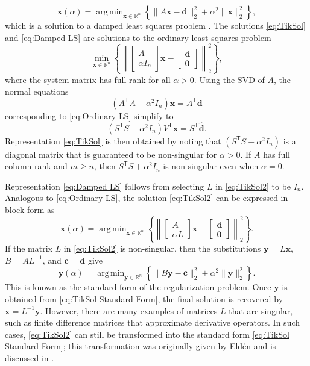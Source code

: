 \documentclass[12pt]{article}
\newcommand{\mA}{m}	%
\newcommand{\cVec}{\mathbf{c}}	%
\newcommand{\dVec}{\mathbf{d}}	%
\newcommand{\xVec}{\mathbf{x}}	%
\newcommand{\trans}[1]{{#1}^\mathsf{T}}	%
\newcommand{\regparam}{\alpha}  %
\DeclareMathOperator*{\argmin}{arg\,min}
\newcommand{\zeroVec}{\bm{0}}	%
\newcommand{\svd}[1]{\widehat{#1}}	%
\begin{document}
\begin{equation}
\label{eq:Damped LS}
\xVec(\regparam) = \argmin_{\xVec \in \mathbb{R}^n} \left\{\|A\xVec - \dVec\|_2^2 + \regparam^2\|\xVec\|_2^2\right\},
\end{equation}
which is a solution to a damped least squares problem \cite{ABT}. The solutions \eqref{eq:TikSol} and \eqref{eq:Damped LS} are solutions to the ordinary least squares problem
\begin{equation}
\label{eq:Ordinary LS}
\min_{\xVec \in \mathbb{R}^n} \left\{\left\|
\begin{bmatrix}
A \\
\regparam I_n
\end{bmatrix}\xVec - 
\begin{bmatrix}
\dVec \\
\zeroVec
\end{bmatrix}
\right\|_2^2\right\},
\end{equation}
where the system matrix has full rank for all $\regparam > 0$. Using the SVD of $A$, the normal equations 
\[(\trans{A}A + \regparam^2 I_n)\xVec = \trans{A}\dVec\]
corresponding to \eqref{eq:Ordinary LS} simplify to
\[(\trans{S}S + \regparam^2 I_n)\trans{V}\xVec = \trans{S}\svd{\dVec}.\]
Representation \eqref{eq:TikSol} is then obtained by noting that $(\trans{S}S + \regparam^2 I_n)$ is a diagonal matrix that is guaranteed to be non-singular for $\regparam > 0$. If $A$ has full column rank and $\mA \geq n$, then $\trans{S}S + \regparam^2 I_n$ is non-singular even when $\regparam = 0$. \par
Representation \eqref{eq:Damped LS} follows from selecting $L$ in \eqref{eq:TikSol2} to be $I_n$. Analogous to \eqref{eq:Ordinary LS}, the solution \eqref{eq:TikSol2} can be expressed in block form as
\begin{equation}
\xVec(\regparam) = \argmin_{\xVec \in \mathbb{R}^n} \left\{\left\| \begin{bmatrix}
A \\
\regparam L
\end{bmatrix}\xVec - \begin{bmatrix}
\dVec \\
\bm{0}
\end{bmatrix} \right\|_2^2\right\}.
\label{eq:TikSol3}
\end{equation}
If the matrix $L$ in \eqref{eq:TikSol2} is non-singular, then the substitutions $\mathbf{y} = L\xVec$, $B = A{L}^{-1}$, and $\cVec = \dVec$ give
\begin{equation}
\mathbf{y}(\regparam) = \argmin_{\mathbf{y} \in \mathbb{R}^n} \left\{\|B\mathbf{y} - \cVec\|_2^2 + \regparam^2\|\mathbf{y}\|_2^2\right\}.
\label{eq:TikSol Standard Form}
\end{equation}
This is known as the standard form of the regularization problem. Once $\mathbf{y}$ is obtained from \eqref{eq:TikSol Standard Form}, the final solution is recovered by $\xVec = L^{-1}\mathbf{y}$.  However, there are many examples of matrices $L$ that are singular, such as finite difference matrices that approximate derivative operators. In such cases, \eqref{eq:TikSol2} can still be transformed into the standard form \eqref{eq:TikSol Standard Form}; this transformation was originally given by Eld\'{e}n \cite{Elden} and is discussed in \cite{Hansen:98}.
\end{document}
